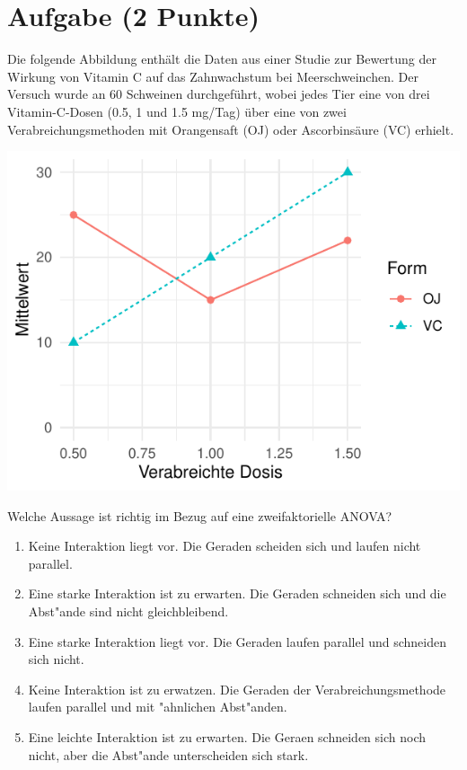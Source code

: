 \documentclass[a4paper, 10pt]{scrartcl}\usepackage[]{graphicx}\usepackage[]{xcolor}
\makeatletter
\def\maxwidth{ %
  \ifdim\Gin@nat@width>\linewidth
    \linewidth
  \else
    \Gin@nat@width
  \fi
}
\makeatother
\begin{document}
\section{Aufgabe \hfill (2 Punkte)}

Die folgende Abbildung enth{\"a}lt die Daten aus einer Studie zur
Bewertung der Wirkung von Vitamin C auf das Zahnwachstum bei
Meerschweinchen. Der Versuch wurde an 60 Schweinen durchgef{\"u}hrt, wobei
jedes Tier eine von drei Vitamin-C-Dosen (0.5, 1 und 1.5 mg/Tag) {\"u}ber eine
von zwei Verabreichungsmethoden mit Orangensaft (OJ)  oder
Ascorbins{\"a}ure (VC) erhielt. 



{\centering \includegraphics[width=\maxwidth]{img/mc-anova-02-a-1} 

}




Welche Aussage ist richtig im Bezug auf eine zweifaktorielle ANOVA?



\begin{enumerate}
\item [\textbf{A} \msquare] Keine Interaktion liegt vor. Die Geraden scheiden sich und laufen nicht parallel.
\item [\textbf{B} \msquare] Eine starke Interaktion ist zu erwarten. Die Geraden schneiden sich und die Abst{"a}nde sind nicht gleichbleibend.
\item [\textbf{C} \msquare] Eine starke Interaktion liegt vor. Die Geraden laufen parallel und schneiden sich nicht.
\item [\textbf{D} \msquare] Keine Interaktion ist zu erwatzen. Die Geraden der Verabreichungsmethode laufen parallel und mit {"a}hnlichen Abst{"a}nden.
\item [\textbf{E} \msquare] Eine leichte Interaktion ist zu erwarten. Die Geraen schneiden sich noch nicht, aber die Abst{"a}nde unterscheiden sich stark.
\end{enumerate} 
\end{document}
